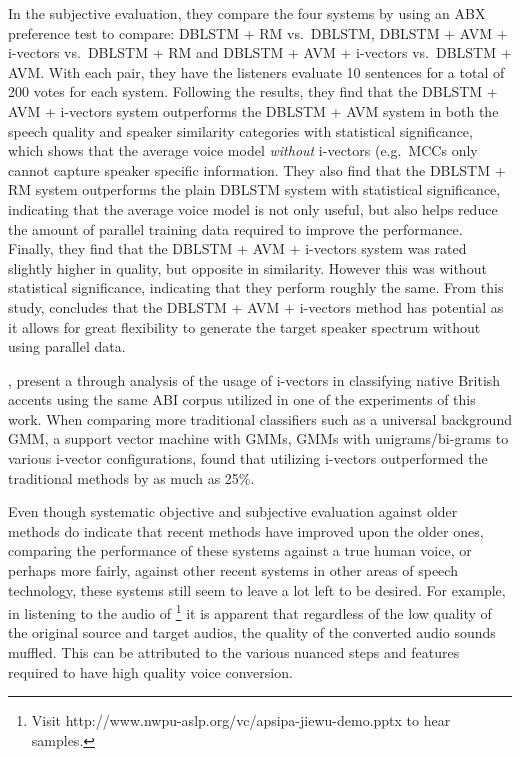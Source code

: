\documentclass
[
    a4paper,
    twoside,
    12pt,
]
{report}
\begin{document}
In the subjective evaluation, they compare the four systems by using an
ABX preference test to compare: DBLSTM + RM vs.~DBLSTM, DBLSTM + AVM +
i-vectors vs.~DBLSTM + RM and DBLSTM + AVM + i-vectors vs.~DBLSTM + AVM.
With each pair, they have the listeners evaluate 10 sentences for a
total of 200 votes for each system. Following the results, they find
that the DBLSTM + AVM + i-vectors system outperforms the DBLSTM + AVM
system in both the speech quality and speaker similarity categories with
statistical significance, which shows that the average voice model
\emph{without} i-vectors (e.g.~MCCs only cannot capture speaker specific
information. They also find that the DBLSTM + RM system outperforms the
plain DBLSTM system with statistical significance, indicating that the
average voice model is not only useful, but also helps reduce the amount
of parallel training data required to improve the performance. Finally,
they find that the DBLSTM + AVM + i-vectors system was rated slightly
higher in quality, but opposite in similarity. However this was without
statistical significance, indicating that they perform roughly the same.
From this study, \textcite{wu2016} concludes that the DBLSTM + AVM +
i-vectors method has potential as it allows for great flexibility to
generate the target speaker spectrum without using parallel data.

\textcite{demarco2013}, present a through analysis of the usage of
i-vectors in classifying native British accents using the same ABI
corpus utilized in one of the experiments of this work. When comparing
more traditional classifiers such as a universal background GMM, a
support vector machine with GMMs, GMMs with unigrams/bi-grams to various
i-vector configurations, \textcite{demarco2013} found that utilizing
i-vectors outperformed the traditional methods by as much as 25\%.

Even though systematic objective and subjective evaluation against older
methods do indicate that recent methods have improved upon the older
ones, comparing the performance of these systems against a true human
voice, or perhaps more fairly, against other recent systems in other
areas of speech technology, these systems still seem to leave a lot left
to be desired. For example, in listening to the audio of
\textcite{wu2016}\footnote{Visit http://www.nwpu-aslp.org/vc/apsipa-jiewu-demo.pptx to hear samples.}
it is apparent that regardless of the low quality of the original source
and target audios, the quality of the converted audio sounds muffled.
This can be attributed to the various nuanced steps and features
required to have high quality voice conversion.
\end{document}
